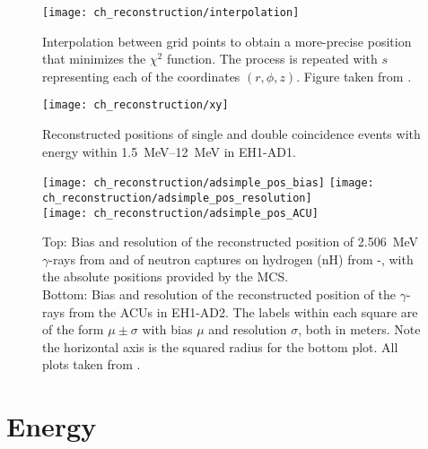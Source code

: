 \begin{figure}
    \centering
    \texttt{[image: ch\_reconstruction/interpolation]}
    \caption[Position reconstruction interpolation]{
        Interpolation between grid points to obtain a more-precise position
        that minimizes the $\chi^2$ function.
        The process is repeated with $s$ representing each of the coordinates
        $(r, \phi, z)$.
        Figure taken from \cite{adsimple1}.
    }
    \label{fig:interpolation}
\end{figure}

\begin{figure}
    \centering
    \texttt{[image: ch\_reconstruction/xy]}
    \caption[Reconstructed position distribution]{
        Reconstructed positions of single and double coincidence events
        with energy within \SIrange{1.5}{12}{\MeV} in EH1-AD1.
    }
    \label{fig:position_map}
\end{figure}

\begin{figure}
    \centering
    \texttt{[image: ch\_reconstruction/adsimple\_pos\_bias]}
    \texttt{[image: ch\_reconstruction/adsimple\_pos\_resolution]} \\
    \texttt{[image: ch\_reconstruction/adsimple\_pos\_ACU]}
    \caption[Bias and resolution of position reconstruction]{
        Top: Bias and resolution of the reconstructed position
        of \SI{2.506}{\MeV} $\gamma$-rays from  and
        of neutron captures on hydrogen (nH) from -,
        with the absolute positions provided by the MCS.\\
        Bottom: Bias and resolution of the reconstructed position
        of the  $\gamma$-rays from the ACUs in EH1-AD2.
        The labels within each square are of the form $\mu\pm\sigma$
        with bias $\mu$ and resolution $\sigma$, both in meters.
        Note the horizontal axis is the squared radius for the bottom plot.
        All plots taken from \cite{adtime_performance}.
    }
    \label{fig:position_bias_reso}
\end{figure}

\section{Energy}
\label{sec:reco_energy}

